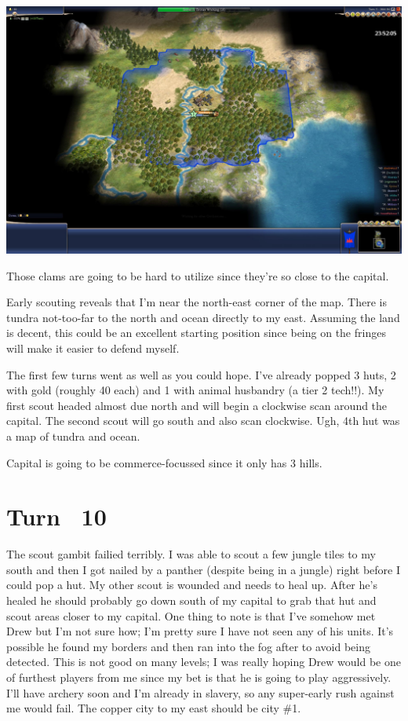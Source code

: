 \documentclass[10pt]{article}
\begin{document}
\includegraphics[width=1.0\textwidth]{turn5.JPG}

Those clams are going to be hard to utilize since they're so close to the capital.

Early scouting reveals that I'm near the north-east corner of the
map. There is tundra not-too-far to the north and ocean directly to my
east. Assuming the land is decent, this could be an excellent starting
position since being on the fringes will make it easier to defend
myself.

The first few turns went as well as you could hope. I've already
popped 3 huts, 2 with gold (roughly 40 each) and 1 with animal
husbandry (a tier 2 tech!!). My first scout headed almost due north
and will begin a clockwise scan around the capital. The second scout
will go south and also scan clockwise. Ugh, 4th hut was a map of
tundra and ocean.

Capital is going to be commerce-focussed since it only has 3 hills.

\section*{Turn ~10}

The scout gambit failied terribly. I was able to scout a few jungle
tiles to my south and then I got nailed by a panther (despite being in
a jungle) right before I could pop a hut. My other scout is wounded
and needs to heal up. After he's healed he should probably go down
south of my capital to grab that hut and scout areas closer to my
capital. One thing to note is that I've somehow met Drew but I'm not
sure how; I'm pretty sure I have not seen any of his units. It's
possible he found my borders and then ran into the fog after to avoid
being detected. This is not good on many levels; I was really hoping
Drew would be one of furthest players from me since my bet is that he
is going to play aggressively. I'll have archery soon and I'm already
in slavery, so any super-early rush against me would fail. The copper
city to my east should be city \#1.
\end{document}
